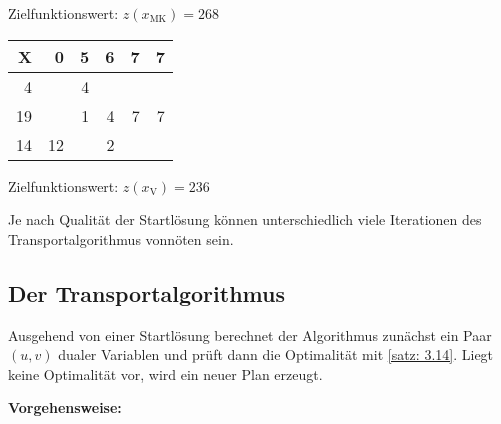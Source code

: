 \begin{beispiel}
	Zielfunktionswert: $z(x_{\text{MK}}) = 268$

	\vspace{\parskip}
	
	\begin{center}
		\begin{tabular}{r|rrrrr}
			X & 0 &  5 &  6 &  7 &  7 \\ \hline
			4 &  &  4 &  &   &   \\
			19 &  & 1 & 4 &  7 &  7 \\
			14 &  12 &  &  2 &   & 
		\end{tabular}
	\end{center}
	Zielfunktionswert: $z(x_{\text{V}}) = 236$
\end{beispiel}

Je nach Qualität der Startlösung können unterschiedlich viele Iterationen des Transportalgorithmus vonnöten sein.

\subsection{Der Transportalgorithmus}

Ausgehend von einer Startlösung berechnet der Algorithmus zunächst ein Paar $(u,v)$ dualer Variablen und prüft dann die Optimalität mit \cref{satz: 3.14}. Liegt keine Optimalität vor, wird ein neuer Plan erzeugt.

\textbf{Vorgehensweise:}

